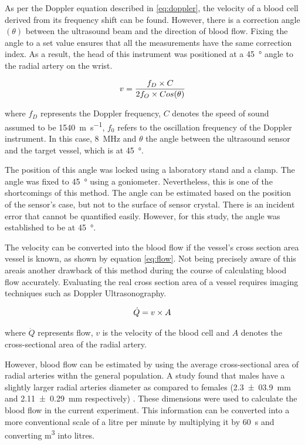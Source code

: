 As per the Doppler equation described in \ref{eq:doppler}, the velocity of a blood cell derived from its frequency shift can be found. However, there is a correction angle $(\theta)$ between the ultrasound beam and the direction of blood flow. Fixing the angle to a set value ensures that all the measurements have the same correction index.  As a result, the head of this instrument was positioned at a \SI{45}{\degree} angle to the radial artery on the wrist.

\begin{align}
	\label{eq:doppler}
	v = \frac{f_D \times C}{2 f_O \times Cos(\theta)} \tagaddtext{[\si{\meter\per\second}]}
\end{align}

where $f_D$ represents the Doppler frequency, $C$ denotes the speed of sound assumed to be \SI{1540}{\meter\per\second}, $f_0$ refers to the oscillation frequency of the Doppler instrument. In this case, \SI{8}{\mega\hertz} and $\theta$ the angle between the ultrasound sensor and the target vessel, which is at \SI{45}{\degree}.

The position of this angle was locked using a laboratory stand and a clamp. The angle was fixed to \SI{45}{\degree} using a goniometer. Nevertheless, this is one of the shortcomings of this method. The angle can be estimated based on the position of the sensor's case, but not to the surface of sensor crystal. There is an incident error that cannot be quantified easily. However, for this study, the angle was established to be at \SI{45}{\degree}.

The velocity can be converted into the blood flow if the vessel's cross section area vessel is known, as shown by equation \ref{eq:flow}. Not being precisely aware of this areais another drawback of this method during the course of calculating blood flow accurately. Evaluating the real cross section area of a vessel requires imaging techniques such as Doppler Ultrasonography. 

\begin{align}
	\label{eq:flow}
	\dot{Q} = v \times A \tagaddtext{[\si{\cubic\meter\per\second}]}
\end{align}

where $\dot{Q}$ represents flow, $v$ is the velocity of the blood cell and $A$ denotes the cross-sectional area of the radial artery.

However, blood flow can be estimated by using the average cross-sectional area of radial arteries withn the general population. A study found that males have a slightly larger radial arteries diameter as compared to females (\SI{2.3(039)}{\mm} and \SI{2.11(029)}{\mm} respectively) \cite{ashraf2010size}. These dimensions were used to calculate the blood flow in the current experiment. This information can be converted into a more conventional scale of a litre per minute by multiplying it by \SI{60}{\second} and converting \si{\cubic\meter} into litres. 

